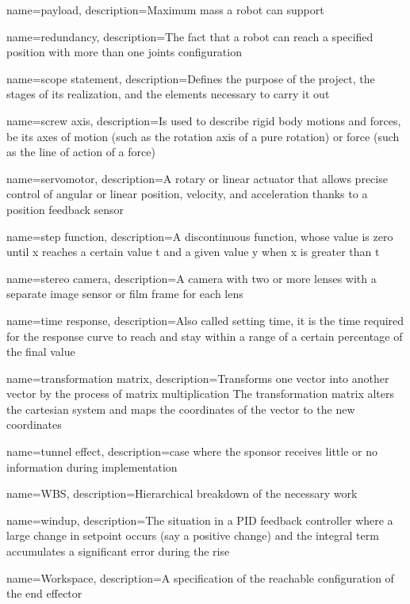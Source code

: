 {
    name=payload,
    description={Maximum mass a robot can support}
}

{
    name=redundancy,
    description={The fact that a robot can reach a specified position with more than one joints configuration}
}

{
    name=scope statement,
    description={Defines the purpose of the project, the stages of its realization, and the elements necessary to carry it out}
}

{
    name=screw axis,
    description={Is used to describe rigid body motions and forces, be its axes of motion (such as the rotation axis of a pure rotation) or force (such as the line of action of a force)}
}

{
    name=servomotor,
    description={A rotary or linear actuator that allows precise control of angular or linear position, velocity, and acceleration thanks to a position feedback sensor}
}

{
    name=step function,
    description={A discontinuous function, whose value is zero until x reaches a certain value t and a given value y when x is greater than t}
}

{
    name=stereo camera,
    description={A camera with two or more lenses with a separate image sensor or film frame for each lens}
}

{
    name=time response,
    description={Also called setting time, it is the time required for the response curve to reach and stay within a range of a certain percentage of the final value}
}

{
    name=transformation matrix,
    description={Transforms one vector into another vector by the process of matrix multiplication The transformation matrix alters the cartesian system and maps the coordinates of the vector to the new coordinates}
}

{
    name=tunnel effect,
    description={case where the sponsor receives little or no information during implementation}
}

{
    name=WBS,
    description={Hierarchical breakdown of the necessary work}
}

{
    name=windup,
    description={The situation in a PID feedback controller where a large change in setpoint occurs (say a positive change) and the integral term accumulates a significant error during the rise}
}

{
    name=Workspace,
    description={A specification of the reachable configuration of the end effector}
}